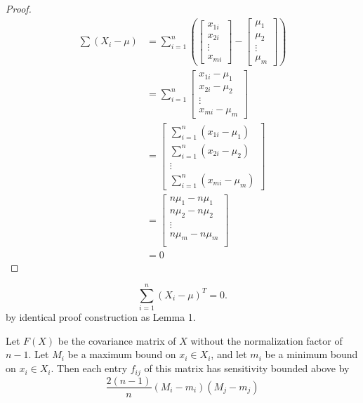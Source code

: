 \documentclass[11pt, oneside]{article}   	%
\begin{document}
\begin{proof}
\begin{align*}
\sum(X_i - \mu) &= \sum_{i=1}^n \left(
\begin{bmatrix}
x_{1i}\\
x_{2i}\\
\vdots \\
x_{mi}
\end{bmatrix}
-
\begin{bmatrix}
\mu_1\\
\mu_2\\
\vdots \\
\mu_m
\end{bmatrix}
\right)\\
&= \sum_{i=1}^n
\begin{bmatrix}
x_{1i} - \mu_1 \\
x_{2i} - \mu_2 \\
\vdots\\
x_{mi} - \mu_m
\end{bmatrix}\\
&= 
\begin{bmatrix}
\sum_{i=1}^n (x_{1i} - \mu_1) \\
\sum_{i=1}^n (x_{2i} - \mu_2) \\
\vdots\\
\sum_{i=1}^n (x_{mi} - \mu_m)
\end{bmatrix} \\
&= 
\begin{bmatrix}
n\mu_1 - n\mu_1\\
n\mu_2 - n\mu_2 \\
\vdots\\
n\mu_m - n\mu_m \\
\end{bmatrix}\\
&= 0
\end{align*}
\end{proof}

\begin{corollary}
\label{corollary:sum0}
$$\sum_{i=1}^n (X_i - \mu)^T = 0.$$ by identical proof construction as Lemma 1.
\end{corollary}

\begin{theorem}
Let $F(X)$ be the covariance matrix of $X$ without the normalization factor of $n-1$. Let $M_i$ be a maximum bound on $x_i \in X_i$, and let $m_i$ be a minimum bound on $x_i \in X_i$. Then each entry $f_{ij}$ of this matrix has sensitivity bounded above by
$$\frac{2(n-1)}{n}(M_i - m_i)(M_j - m_j)$$
\end{theorem}
\end{document}
